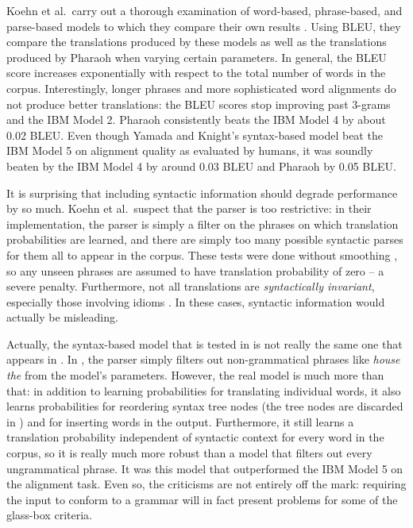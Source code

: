 \documentclass[11pt]{article}
\begin{document}
Koehn et al.\ carry out a thorough examination of word-based, phrase-based, and parse-based models 
to which they compare their own results \cite{koehn:03}. Using BLEU, they compare the translations
produced by these models as well as the translations produced by Pharaoh when varying certain parameters.
In general, the BLEU score increases exponentially with respect to the total number of words in the corpus.
Interestingly, longer phrases and more sophisticated word alignments do not produce better translations:
the BLEU scores stop improving past 3-grams and the IBM Model 2.
Pharaoh consistently beats the IBM Model 4 by about 0.02 BLEU. Even though Yamada and Knight's
syntax-based model beat the IBM Model 5 on alignment quality as evaluated by humans,
it was soundly beaten by the IBM Model 4 by around 0.03 BLEU and Pharaoh by 0.05 BLEU.

It is surprising that including syntactic information should degrade performance by so much.
Koehn et al.\ suspect that the parser is too restrictive: in their implementation, the parser
is simply a filter on the phrases on which translation probabilities are learned, and there
are simply too many possible syntactic parses for them all to appear in the corpus.
These tests were done without smoothing \cite{koehn:03}, so any unseen phrases
are assumed to have translation probability of zero -- a severe penalty.
Furthermore, not all translations are \textit{syntactically invariant},
especially those involving idioms \cite{dorr_survey, koehn:03}. In these cases, syntactic information would actually be misleading.

Actually, the syntax-based model that is tested in \cite{koehn:03} is not really the same one
that appears in \cite{yamada_knight}. In \cite{koehn:03}, the parser simply filters out
non-grammatical phrases like \textit{house the} from the model's parameters.
However, the real model is much more than that: in addition to learning probabilities
for translating individual words, it also learns probabilities for reordering syntax tree nodes
(the tree nodes are discarded in \cite{koehn:03}) and for inserting words in the output.
Furthermore, it still learns a translation probability independent of syntactic context for every word in the corpus,
so it is really much more robust than a model that filters out every ungrammatical phrase.
It was this model that outperformed the IBM Model 5 on the alignment task.
Even so, the criticisms are not entirely off the mark: requiring the input to conform
to a grammar will in fact present problems for some of the glass-box criteria.
\end{document}
